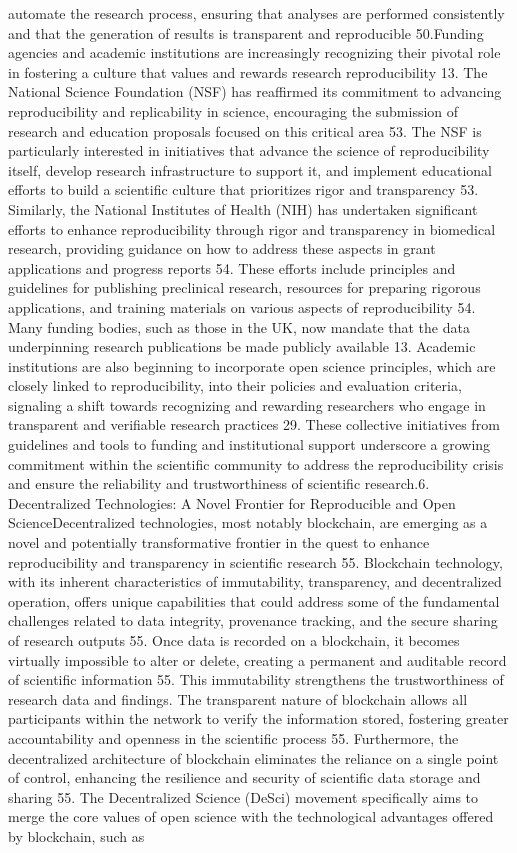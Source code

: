 \documentclass{article}
\begin{document}
automate the research process, ensuring that analyses are performed consistently and that the generation of results is transparent and reproducible 50.Funding agencies and academic institutions are increasingly recognizing their pivotal role in fostering a culture that values and rewards research reproducibility 13. The National Science Foundation (NSF) has reaffirmed its commitment to advancing reproducibility and replicability in science, encouraging the submission of research and education proposals focused on this critical area 53. The NSF is particularly interested in initiatives that advance the science of reproducibility itself, develop research infrastructure to support it, and implement educational efforts to build a scientific culture that prioritizes rigor and transparency 53. Similarly, the National Institutes of Health (NIH) has undertaken significant efforts to enhance reproducibility through rigor and transparency in biomedical research, providing guidance on how to address these aspects in grant applications and progress reports 54. These efforts include principles and guidelines for publishing preclinical research, resources for preparing rigorous applications, and training materials on various aspects of reproducibility 54. Many funding bodies, such as those in the UK, now mandate that the data underpinning research publications be made publicly available 13. Academic institutions are also beginning to incorporate open science principles, which are closely linked to reproducibility, into their policies and evaluation criteria, signaling a shift towards recognizing and rewarding researchers who engage in transparent and verifiable research practices 29. These collective initiatives from guidelines and tools to funding and institutional support underscore a growing commitment within the scientific community to address the reproducibility crisis and ensure the reliability and trustworthiness of scientific research.6. Decentralized Technologies: A Novel Frontier for Reproducible and Open ScienceDecentralized technologies, most notably blockchain, are emerging as a novel and potentially transformative frontier in the quest to enhance reproducibility and transparency in scientific research 55. Blockchain technology, with its inherent characteristics of immutability, transparency, and decentralized operation, offers unique capabilities that could address some of the fundamental challenges related to data integrity, provenance tracking, and the secure sharing of research outputs 55. Once data is recorded on a blockchain, it becomes virtually impossible to alter or delete, creating a permanent and auditable record of scientific information 55. This immutability strengthens the trustworthiness of research data and findings. The transparent nature of blockchain allows all participants within the network to verify the information stored, fostering greater accountability and openness in the scientific process 55. Furthermore, the decentralized architecture of blockchain eliminates the reliance on a single point of control, enhancing the resilience and security of scientific data storage and sharing 55. The Decentralized Science (DeSci) movement specifically aims to merge the core values of open science with the technological advantages offered by blockchain, such as 
\end{document}
